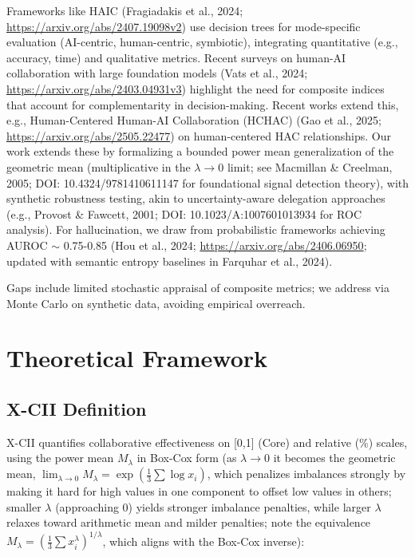 \documentclass{article}
\begin{document}
Frameworks like HAIC (Fragiadakis et al., 2024; \url{https://arxiv.org/abs/2407.19098v2}) use decision trees for mode-specific evaluation (AI-centric, human-centric, symbiotic), integrating quantitative (e.g., accuracy, time) and qualitative metrics. Recent surveys on human-AI collaboration with large foundation models (Vats et al., 2024; \url{https://arxiv.org/abs/2403.04931v3}) highlight the need for composite indices that account for complementarity in decision-making. Recent works extend this, e.g., Human-Centered Human-AI Collaboration (HCHAC) (Gao et al., 2025; \url{https://arxiv.org/abs/2505.22477}) on human-centered HAC relationships. Our work extends these by formalizing a bounded power mean generalization of the geometric mean (multiplicative in the $\lambda \to 0$ limit; see Macmillan \& Creelman, 2005; DOI: 10.4324/9781410611147 for foundational signal detection theory), with synthetic robustness testing, akin to uncertainty-aware delegation approaches (e.g., Provost \& Fawcett, 2001; DOI: 10.1023/A:1007601013934 for ROC analysis). For hallucination, we draw from probabilistic frameworks achieving AUROC $\sim$ 0.75-0.85 (Hou et al., 2024; \url{https://arxiv.org/abs/2406.06950}; updated with semantic entropy baselines in Farquhar et al., 2024).

Gaps include limited stochastic appraisal of composite metrics; we address via Monte Carlo on synthetic data, avoiding empirical overreach.

\section{Theoretical Framework}

\subsection{X-CII Definition}

X-CII quantifies collaborative effectiveness on [0,1] (Core) and relative (\%) scales, using the power mean $M_\lambda$ in Box-Cox form (as $\lambda \to 0$ it becomes the geometric mean, $\lim_{\lambda \to 0} M_\lambda = \exp\left(\frac{1}{3} \sum \log x_i\right)$, which penalizes imbalances strongly by making it hard for high values in one component to offset low values in others; smaller $\lambda$ (approaching 0) yields stronger imbalance penalties, while larger $\lambda$ relaxes toward arithmetic mean and milder penalties; note the equivalence $M_\lambda = \left( \frac{1}{3} \sum x_i^\lambda \right)^{1/\lambda}$, which aligns with the Box-Cox inverse):
\end{document}
